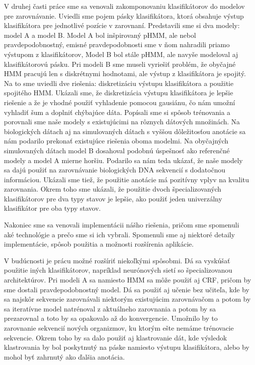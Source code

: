 V druhej časti práce sme sa venovali zakomponovaniu klasifikátorov do modelov pre zarovnávanie. Uviedli sme pojem pásky klasifikátora, ktorá obsahuje výstup klasifikátora pre jednotlivé pozície v zarovnaní. Predstavili sme si dva modely: model A a model B.
Model A bol inšpirovaný pHMM, ale nebol pravdepodobnostný, emisné pravdepodobnosti sme v ňom nahradili priamo výstupom z klasifikátorov,
Model B bol stále pHMM, ale navyše modeloval aj klasifikátorovú pásku.
Pri modeli B sme museli vyriešiť problém, že obyčajné HMM pracujú len s diskrétnymi hodnotami, ale výstup z klasifikátora je spojitý. Na to sme uviedli dve riešenia: diskretizáciu výstupu klasifikátora a použitie spojitého HMM.
Ukázali sme, že diskretizácia výstupu klasifikátora je lepšie riešenie a že je vhodné použiť vyhladenie pomocou gausiánu, čo nám umožní vyhladiť šum a doplniť chýbajúce dáta. Popísali sme si spôsob trénovania a porovnali sme naše modely s existujúcimi na rôznych dátových množinách.
Na biologických dátach aj na simulovaných dátach s vyššou dôležitosťou anotácie sa nám podarilo prekonať existujúce riešenia oboma modelmi. Na obyčajných simulovaných dátach model B dosahoval podobnú úspešnosť ako referenčné modely a model A mierne horšiu. Podarilo sa nám teda ukázať, že naše modely sa dajú použiť na zarovnávanie biologických DNA sekvencií s dodatočnou informáciou. Ukázali sme tiež, že použitie anotácie má pozitívny vplyv na kvalitu zarovnania. Okrem toho sme ukázali, že použitie dvoch špecializovaných klasifikátorov pre dva typy stavov je lepšie, ako použiť jeden univerzálny klasifikátor pre oba typy stavov.

Nakoniec sme sa venovali implementácii nášho riešenia, pričom sme spomenuli aké technológie a prečo sme si ich vybrali. Spomenuli sme aj niektoré detaily implementácie, spôsob použitia a možnosti rozšírenia aplikácie.

V budúcnosti je prácu možné rozšíriť niekoľkými spôsobmi. Dá sa vyskúšať použitie iných klasifikátorov, napríklad neurónových sietí so špecializovanou architektúrov. Pri modeli A sa namiesto HMM sa môže použiť aj CRF, pričom by sme dostali pravdepodobnostný model. Dá sa použiť aj učenie bez učiteľa, kde by sa najskôr sekvencie zarovnávali niektorým existujúcim zarovnávačom a potom by sa iteratívne model natrénoval z aktuálneho zarovnania a potom by sa prezarovnal a toto by sa opakovalo až do konvergencie. Umožnilo by to zarovnanie sekvencií nových organizmov, ku ktorým ešte nemáme trénovacie sekvencie. Okrem toho by sa dalo použiť aj klastrovanie dát, kde výsledok klastrovania by bol poskytnutý na páske namiesto výstupu klasifikátora, alebo by mohol byť zahrnutý ako ďalšia anotácia.
